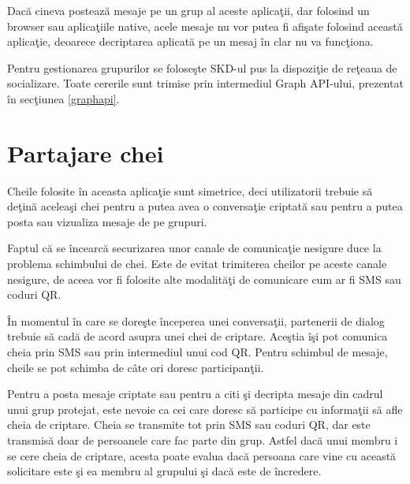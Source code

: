 Dac\u{a} cineva posteaz\u{a} mesaje pe un grup al aceste aplica\c{t}ii, dar folosind un browser sau aplica\c{t}iile native, acele mesaje nu vor putea fi afi\c{s}ate folosind aceast\u{a} aplica\c{t}ie, deoarece decriptarea aplicat\u{a} pe un mesaj \^{i}n clar nu va func\c{t}iona.

Pentru gestionarea grupurilor se folose\c{s}te SKD-ul pus la dispozi\c{t}ie de re\c{t}eaua de socializare. Toate cererile sunt trimise prin intermediul Graph API-ului, prezentat \^{i}n sec\c{t}iunea \ref{graphapi}.

\section{Partajare chei}
\label{chei}

Cheile folosite \^{i}n aceasta aplica\c{t}ie sunt simetrice, deci utilizatorii trebuie s\u{a} de\c{t}in\u{a} acelea\c{s}i chei pentru a putea avea o conversa\c{t}ie criptat\u{a} sau pentru a putea posta sau vizualiza mesaje de pe grupuri.

Faptul c\u{a} se \^{i}ncearc\u{a} securizarea unor canale de comunica\c{t}ie nesigure duce la problema schimbului de chei. Este de evitat trimiterea cheilor pe aceste canale nesigure, de aceea vor fi folosite alte modalit\u{a}\c{t}i de comunicare cum ar fi SMS sau coduri QR.

\^{I}n momentul \^{i}n care se dore\c{s}te \^{i}nceperea unei conversa\c{t}ii, partenerii de dialog trebuie s\u{a} cad\u{a} de acord asupra unei chei de criptare. Ace\c{s}tia \^{i}\c{s}i pot comunica cheia prin SMS sau prin intermediul unui cod QR. Pentru schimbul de mesaje, cheile se pot schimba de c\^{a}te ori doresc participan\c{t}ii.

Pentru a posta mesaje criptate sau pentru a citi \c{s}i decripta mesaje din cadrul unui grup protejat, este nevoie ca cei care doresc s\u{a} participe cu informa\c{t}ii s\u{a} afle cheia de criptare. Cheia se transmite tot prin SMS sau coduri QR, dar este transmis\u{a} doar de persoanele care fac parte din grup. Astfel dac\u{a} unui membru i se cere cheia de criptare, acesta poate evalua dac\u{a} persoana care vine cu aceast\u{a} solicitare este \c{s}i ea membru al grupului \c{s}i dac\u{a} este de \^{i}ncredere.